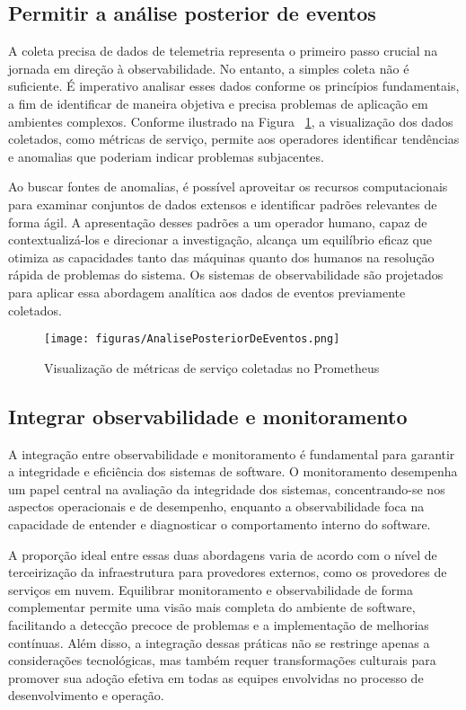 \documentclass[12pt]{article}
\begin{document}
\subsection{Permitir a análise posterior de eventos}

A coleta precisa de dados de telemetria representa o primeiro passo crucial na jornada em direção à observabilidade. No entanto, a simples coleta não é suficiente. É imperativo analisar esses dados conforme os princípios fundamentais, a fim de identificar de maneira objetiva e precisa problemas de aplicação em ambientes complexos. Conforme ilustrado na Figura ~\ref{fig:analisePosterior}, a visualização dos dados coletados, como métricas de serviço, permite aos operadores identificar tendências e anomalias que poderiam indicar problemas subjacentes.


Ao buscar fontes de anomalias, é possível aproveitar os recursos computacionais para examinar conjuntos de dados extensos e identificar padrões relevantes de forma ágil. A apresentação desses padrões a um operador humano, capaz de contextualizá-los e direcionar a investigação, alcança um equilíbrio eficaz que otimiza as capacidades tanto das máquinas quanto dos humanos na resolução rápida de problemas do sistema. Os sistemas de observabilidade são projetados para aplicar essa abordagem analítica aos dados de eventos previamente coletados.

\begin{figure}[!htb]
\centering
\texttt{[image: figuras/AnalisePosteriorDeEventos.png]}
\caption{Visualização de métricas de serviço coletadas no Prometheus}
\label{fig:analisePosterior}
\end{figure}

\subsection{Integrar observabilidade e monitoramento}

A integração entre observabilidade e monitoramento é fundamental para garantir a integridade e eficiência dos sistemas de software. O monitoramento desempenha um papel central na avaliação da integridade dos sistemas, concentrando-se nos aspectos operacionais e de desempenho, enquanto a observabilidade foca na capacidade de entender e diagnosticar o comportamento interno do software. 

A proporção ideal entre essas duas abordagens varia de acordo com o nível de terceirização da infraestrutura para provedores externos, como os provedores de serviços em nuvem. Equilibrar monitoramento e observabilidade de forma complementar permite uma visão mais completa do ambiente de software, facilitando a detecção precoce de problemas e a implementação de melhorias contínuas. Além disso, a integração dessas práticas não se restringe apenas a considerações tecnológicas, mas também requer transformações culturais para promover sua adoção efetiva em todas as equipes envolvidas no processo de desenvolvimento e operação.
\end{document}
